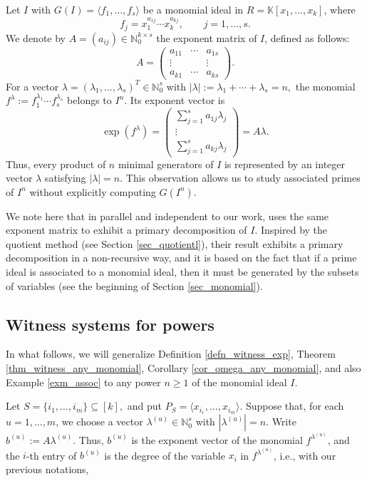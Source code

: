 \documentclass[11pt]{amsart}   %
\begin{document}
Let $I$ with $G(I)=\langle f_1,\ldots,f_s\rangle$ be a monomial ideal in $R=\mathbb K[x_1,\ldots,x_k]$, where
\[
f_j=x_1^{a_{1j}}\cdots x_k^{a_{kj}},
\qquad
j=1,\ldots,s.
\]
We denote by $A=(a_{ij})\in\mathbb N_0^{k\times s}$ the exponent matrix of $I$, defined as follows:
\[
A=
\begin{pmatrix}
a_{11} & \cdots & a_{1s}\\
\vdots & & \vdots\\
a_{k1} & \cdots & a_{ks}
\end{pmatrix}.
\]
For a vector $\lambda=(\lambda_1,\ldots,\lambda_s)^T\in\mathbb N_0^s$ with
$|\lambda|:=\lambda_1+\cdots+\lambda_s=n,$ the monomial
$f^\lambda:=f_1^{\lambda_1}\cdots f_s^{\lambda_s}$ belongs to $I^n$. Its exponent vector is
\[
\operatorname{exp}(f^\lambda)
=
\begin{pmatrix}
\displaystyle\sum_{j=1}^s a_{1j}\lambda_j\\
\vdots\\
\displaystyle\sum_{j=1}^s a_{kj}\lambda_j
\end{pmatrix}
=
A\lambda.
\]
Thus, every product of $n$  minimal generators of $I$ is represented by an
integer vector $\lambda$ satisfying $|\lambda|=n$.
This observation allows us to study associated primes of $I^n$
without explicitly computing $G(I^n)$.

We note here that in parallel and independent to our work, \cite{JMi} uses the same exponent matrix to exhibit a primary decomposition of $I$. Inspired by the quotient method (see Section \ref{sec_quotientl}), their result exhibits a primary decomposition in a non-recursive way, and it is based on the fact that if a prime ideal is associated to a monomial ideal, then it must be generated by the subsets of variables (see the beginning of Section  \ref{sec_monomial}).     

\subsection{Witness systems for powers}
\label{sec_power_witnesses}

In what follows, we will generalize Definition \ref{defn_witness_exp}, Theorem \ref{thm_witness_any_monomial}, Corollary \ref{cor_omega_any_monomial}, and also Example \ref{exm_assoc} to any power $n\geq 1$ of the monomial ideal $I$.


Let $S=\{i_1,\ldots,i_m\}\subseteq [k],$ and put $P_S=\langle x_{i_1},\ldots,x_{i_m}\rangle.$
Suppose that, for each $u=1,\ldots,m$, we choose a vector $\lambda^{(u)}\in\mathbb N_0^s$ with $|\lambda^{(u)}|=n.$
Write $b^{(u)}:=A\lambda^{(u)}.$ Thus,  $b^{(u)}$ is the exponent vector of the monomial
$f^{\lambda^{(u)}}$, and the $i$-th entry of $b^{(u)}$ is the degree of the variable $x_i$ in $f^{\lambda^{(u)}}$, i.e., with our previous notations,
\end{document}

